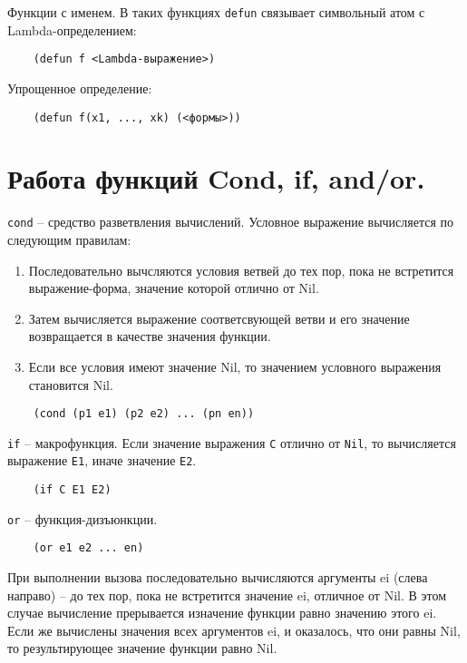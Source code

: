 Функции с именем. В таких функциях \texttt{defun} связывает символьный атом с Lambda-определением:

\begin{lstlisting}
	(defun f <Lambda-выражение>)
\end{lstlisting}

Упрощенное определение:

\begin{lstlisting}
	(defun f(x1, ..., xk) (<формы>))
\end{lstlisting}


\section{Работа функций Cond, if, and/or.}

\texttt{cond} -- средство разветвления вычислений. Условное выражение вычисляется по следующим правилам:

\begin{enumerate}
	\item Последовательно вычсляются условия ветвей до тех пор, пока не встретится выражение-форма, значение которой отлично от Nil.
	\item Затем вычисляется выражение соответсвующей ветви и его значение возвращается в качестве значения функции.
	\item Если все условия имеют значение Nil, то значением условного выражения становится Nil.
\end{enumerate}

\begin{lstlisting}
	(cond (p1 e1) (p2 e2) ... (pn en))
\end{lstlisting}


\texttt{if} -- макрофункция. Если значение выражения \texttt{C} отлично от \texttt{Nil}, то вычисляется выражение \texttt{E1}, иначе значение \texttt{E2}.

\begin{lstlisting}
	(if C E1 E2)
\end{lstlisting}

\texttt{or} -- функция-дизъюнкции.

\begin{lstlisting}
	(or e1 e2 ... en)
\end{lstlisting}

При  выполнении вызова последовательно  вычисляются  аргументы ei (слева направо) -- до тех пор, пока не встретится значение ei, отличное от Nil.  В этом случае  вычисление  прерывается  изначение  функции  равно значению этого ei. Если  же  вычислены значения всех  аргументов ei, и оказалось,  что они    равны Nil,  то  результирующее  значение  функции равно Nil.


